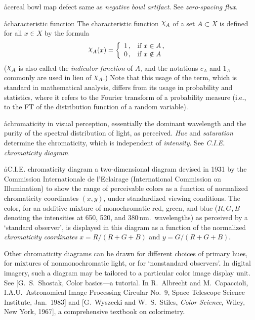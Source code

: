 \aa{cereal bowl map defect}
same as {\it negative bowl artifact}.
See {\it zero-spacing flux}.

\aa{characteristic function}
The characteristic function $\charfn A$ of a set $A\subset X$
is defined for all $x\in X$ by the formula
$$\charfn A(x)= \left\{ \begin{array}{ll}
             1\,,&\text{if\ } x\in A\,,\\
             0\,,&\text{if\ } x\notin A\,
             \end{array} \right.
$$
($\charfn A$ is also called the {\sl indicator function} of $A$,
and the notations $c_A$ and $1_A$ commonly are used in lieu of $\charfn A$.)
Note that this usage of the term, which is standard in mathematical
analysis, differs from its usage in probability and statistics,
where it refers to the Fourier transform of a probability measure
(i.e., to the FT of the distribution function of a random variable).

\aa{chromaticity}
in visual perception, essentially the dominant wavelength
and the purity of the spectral distribution of light, as perceived.
{\it Hue} and {\it saturation} determine the chromaticity,
which is independent of {\it intensity}.
See {\it C.I.E. chromaticity diagram}.

\aa{C.I.E. chromaticity diagram}
a two-dimensional diagram devised in 1931
by the Commission Internationale de l'Eclairage
(International Commission on Illumination)
to show the range of perceivable colors
as a function of normalized chromaticity coordinates $(x,y)$,
under standardized viewing conditions.
The color, for an additive mixture of monochromatic
red, green, and blue ($R,G,B$ denoting the intensities
at 650, 520, and 380\,nm.\ wavelengths)
as perceived by a `standard observer',
is displayed in this diagram as a function of
the normalized {\it chromaticity coordinates}
$x=R/(R+G+B)$ and $y=G/(R+G+B)$.
\par
Other chromaticity diagrams can be drawn for different choices
of primary hues, for mixtures of nonmonochromatic light,
or for `nonstandard observers'.
In digital imagery, such a diagram may be tailored
to a particular color image display unit.
See [G.~S.~Shostak, Color basics---a tutorial.
In R.~Albrecht and M.~Capaccioli, I.A.U.\ Astronomical
Image Processing Circular No.~9, Space Telescope Science
Institute, Jan.~1983] and
[G.~Wyszecki and W.~S.~Stiles, {\it Color Science}, Wiley, New York, 1967],
a comprehensive textbook on colorimetry.

